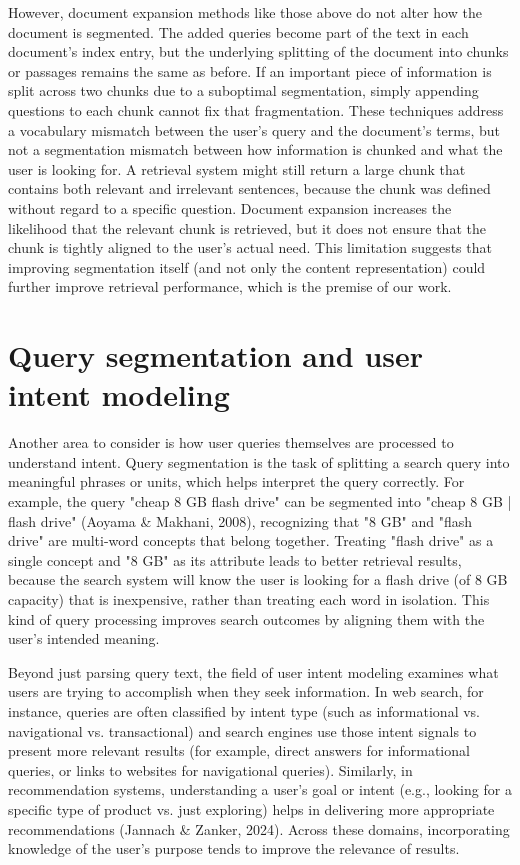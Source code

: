 \documentclass[12pt,a4paper]{report}
\begin{document}
However, document expansion methods like those above do not alter how the document is segmented. The added queries become part of the text in each document's index entry, but the underlying splitting of the document into chunks or passages remains the same as before. If an important piece of information is split across two chunks due to a suboptimal segmentation, simply appending questions to each chunk cannot fix that fragmentation. These techniques address a vocabulary mismatch between the user's query and the document's terms, but not a segmentation mismatch between how information is chunked and what the user is looking for. A retrieval system might still return a large chunk that contains both relevant and irrelevant sentences, because the chunk was defined without regard to a specific question. Document expansion increases the likelihood that the relevant chunk is retrieved, but it does not ensure that the chunk is tightly aligned to the user's actual need. This limitation suggests that improving segmentation itself (and not only the content representation) could further improve retrieval performance, which is the premise of our work.

\section{Query segmentation and user intent modeling}

Another area to consider is how user queries themselves are processed to understand intent. Query segmentation is the task of splitting a search query into meaningful phrases or units, which helps interpret the query correctly. For example, the query "cheap 8 GB flash drive" can be segmented into "cheap 8 GB | flash drive" (Aoyama \& Makhani, 2008), recognizing that "8 GB" and "flash drive" are multi-word concepts that belong together. Treating "flash drive" as a single concept and "8 GB" as its attribute leads to better retrieval results, because the search system will know the user is looking for a flash drive (of 8 GB capacity) that is inexpensive, rather than treating each word in isolation. This kind of query processing improves search outcomes by aligning them with the user's intended meaning.

Beyond just parsing query text, the field of user intent modeling examines what users are trying to accomplish when they seek information. In web search, for instance, queries are often classified by intent type (such as informational vs. navigational vs. transactional) and search engines use those intent signals to present more relevant results (for example, direct answers for informational queries, or links to websites for navigational queries). Similarly, in recommendation systems, understanding a user's goal or intent (e.g., looking for a specific type of product vs. just exploring) helps in delivering more appropriate recommendations (Jannach \& Zanker, 2024). Across these domains, incorporating knowledge of the user's purpose tends to improve the relevance of results.
\end{document}
